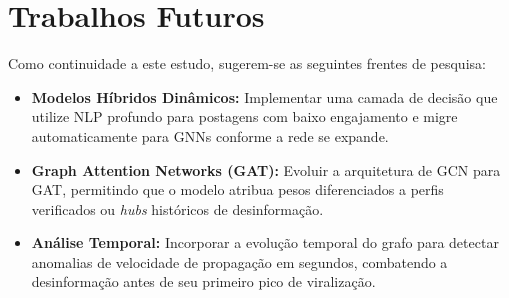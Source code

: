 \section{Trabalhos Futuros}

Como continuidade a este estudo, sugerem-se as seguintes frentes de pesquisa:
\begin{itemize}
    \item \textbf{Modelos Híbridos Dinâmicos:} Implementar uma camada de decisão que utilize NLP profundo para postagens com baixo engajamento e migre automaticamente para GNNs conforme a rede se expande.
    \item \textbf{Graph Attention Networks (GAT):} Evoluir a arquitetura de GCN para GAT, permitindo que o modelo atribua pesos diferenciados a perfis verificados ou \textit{hubs} históricos de desinformação.
    \item \textbf{Análise Temporal:} Incorporar a evolução temporal do grafo para detectar anomalias de velocidade de propagação em segundos, combatendo a desinformação antes de seu primeiro pico de viralização.
\end{itemize}
